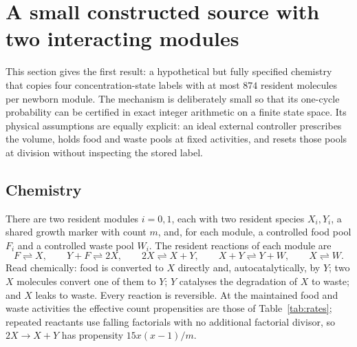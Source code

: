 \section{A small constructed source with two interacting modules}\label{sec:constructed}

This section gives the first result: a hypothetical but fully specified chemistry that copies four concentration-state labels with at most $874$ resident molecules per newborn module. The mechanism is deliberately small so that its one-cycle probability can be certified in exact integer arithmetic on a finite state space. Its physical assumptions are equally explicit: an ideal external controller prescribes the volume, holds food and waste pools at fixed activities, and resets those pools at division without inspecting the stored label.

\subsection{Chemistry}\label{sec:chem}
There are two resident modules $i=0,1$, each with two resident species $X_i,Y_i$, a shared growth marker with count $m$, and, for each module, a controlled food pool $F_i$ and a controlled waste pool $W_i$. The resident reactions of each module are
\begin{equation}\label{eq:resident}
 F\rightleftharpoons X,\qquad Y+F\rightleftharpoons2X,\qquad
 2X\rightleftharpoons X+Y,\qquad X+Y\rightleftharpoons Y+W,\qquad X\rightleftharpoons W.
\end{equation}
Read chemically: food is converted to $X$ directly and, autocatalytically, by $Y$; two $X$ molecules convert one of them to $Y$; $Y$ catalyses the degradation of $X$ to waste; and $X$ leaks to waste. Every reaction is reversible. At the maintained food and waste activities the effective count propensities are those of Table~\ref{tab:rates}; repeated reactants use falling factorials with no additional factorial divisor, so $2X\to X+Y$ has propensity $15x(x-1)/m$.

